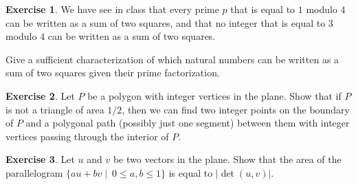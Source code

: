 \documentclass[12pt,a4paper]{article}
\theoremstyle{plain}
\newtheorem*{Sol*}{Solution}
\theoremstyle{definition}
\newtheorem{Ex}{Exercise}
\def \N {\mathbb N}
\newif\ifsolutions
\newcommand{\exercise}[2]{
			\begin{Ex} #1 \end{Ex}
			\ifsolutions  \begin{Sol*} #2 \end{Sol*} \bigskip \else \bigskip  \fi
		}
\begin{document}
\exercise{
	We have see in class that every prime $p$ that is equal to $1$ modulo $4$ can be written as a sum of two squares, and that no integer that is equal to $3$ modulo $4$ can be written as a sum of two squares.

	Give a sufficient characterization of which natural numbers can be written as a sum of two squares given their prime factorization.
}
{
	Any positive integer $n$ with prime decomposition
		\[ n = 2^{n_2} \cdot \prod_{p \equiv 1 \mod{4}} p^{n_p} \cdot  \prod_{p \equiv 3 \mod{4}} p^{2n_p}, \]
	where $n_p \in \N_0$ for each prime $p$, may be written as the sum of two squares.

	To show that the characterization is necessary, one needs that whenever $ab$ is sum of two squares and $\gcd(a,b) = 1$, then both $a$ and $b$ are sum of two squares.
	The proof of this statement can be seen in an Algebraic Number Theory course.
}

\exercise{
	Let $P$ be a polygon with integer vertices in the plane. Show that if $P$ is not a triangle of area $1/2$, then we can find two integer points on the boundary of $P$ and a polygonal path (possibly just one segment) between them with integer vertices passing through the interior of $P$.

}
{}

\exercise{
	Let $u$ and $v$ be two vectors in the plane. Show that the area of the parallelogram
	$\{au+bv \mid ~0 \leq a, b \leq 1\}$ is equal to $|\det(u,v)|$.
  }
{}
\end{document}
